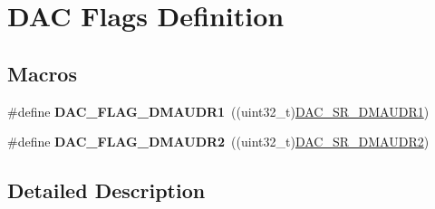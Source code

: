\hypertarget{group___d_a_c__flags__definition}{}\section{D\+AC Flags Definition}
\label{group___d_a_c__flags__definition}
\subsection*{Macros}
\begin{DoxyCompactItemize}
\item 
\mbox{\label{group___d_a_c__flags__definition_ga4ebd189564670bd02bdc7bdbe4fde19b}} 
\#define {\bfseries D\+A\+C\+\_\+\+F\+L\+A\+G\+\_\+\+D\+M\+A\+U\+D\+R1}~((uint32\+\_\+t)\mbox{\hyperlink{group___peripheral___registers___bits___definition_ga7d2048d6b521fb0946dc8c4e577a49c0}{D\+A\+C\+\_\+\+S\+R\+\_\+\+D\+M\+A\+U\+D\+R1}})
\item 
\mbox{\label{group___d_a_c__flags__definition_gaff0765072ab7c0605910627ba1c50816}} 
\#define {\bfseries D\+A\+C\+\_\+\+F\+L\+A\+G\+\_\+\+D\+M\+A\+U\+D\+R2}~((uint32\+\_\+t)\mbox{\hyperlink{group___peripheral___registers___bits___definition_gaf16e48ab85d9261c5b599c56b14aea5d}{D\+A\+C\+\_\+\+S\+R\+\_\+\+D\+M\+A\+U\+D\+R2}})
\end{DoxyCompactItemize}


\subsection{Detailed Description}
